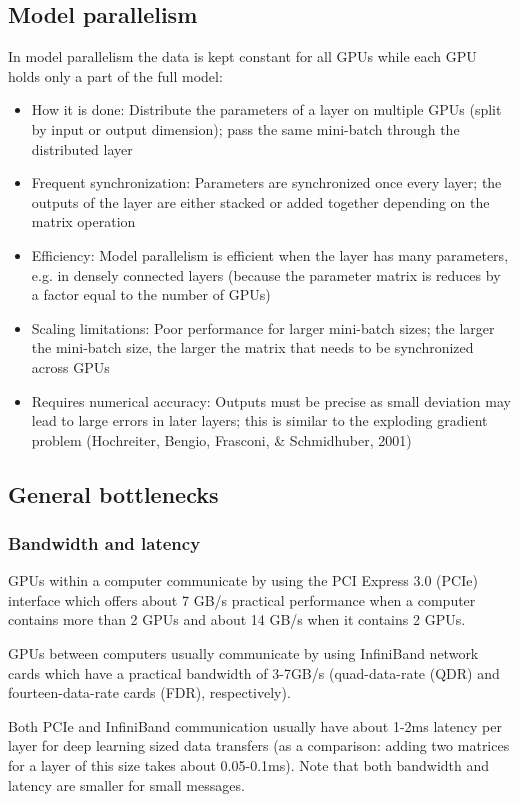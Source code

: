 \documentclass{article} %
\begin{document}
\subsection{Model parallelism}
In model parallelism the data is kept constant for all GPUs while each GPU holds only a part of the full model:
 \begin{itemize}
 	\item How it is done: Distribute the parameters of a layer on multiple GPUs (split by input or output dimension); pass the same mini-batch through the distributed layer
 	\item Frequent synchronization: Parameters are synchronized once every layer; the outputs of the layer are either stacked or added together depending on the matrix operation
 	\item Efficiency: Model parallelism is efficient when the layer has many parameters, e.g. in densely connected layers (because the parameter matrix is reduces by a factor equal to the number of GPUs)
 	\item Scaling limitations: Poor performance for larger mini-batch sizes; the larger the mini-batch size, the larger the matrix that needs to be synchronized across GPUs
 	\item Requires numerical accuracy: Outputs must be precise as small deviation may lead to large errors in later layers; this is similar to the exploding gradient problem (Hochreiter, Bengio, Frasconi, \& Schmidhuber, 2001)
 \end{itemize}
 
\subsection{General bottlenecks}
\subsubsection{Bandwidth and latency}
GPUs within a computer communicate by using the PCI Express 3.0 (PCIe) interface which offers about 7 GB/s practical performance when a computer contains more than 2 GPUs and about 14 GB/s when it contains 2 GPUs. 

GPUs between computers usually communicate by using InfiniBand network cards which have a practical bandwidth of 3-7GB/s (quad-data-rate (QDR) and fourteen-data-rate cards (FDR), respectively).

Both PCIe and InfiniBand communication usually have about 1-2ms latency per layer for deep learning sized data transfers (as a comparison: adding two matrices for a layer of this size takes about 0.05-0.1ms). Note that both bandwidth and latency are smaller for small messages. 
\end{document}
